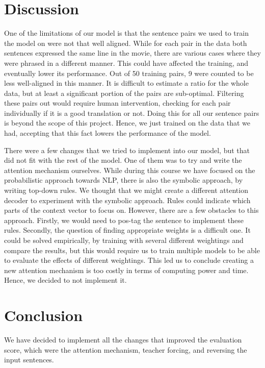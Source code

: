 \documentclass[11pt]{article}
\begin{document}
\section{Discussion}
One of the limitations of our model is that the sentence pairs we used to train the model on were not that well aligned. While for each pair in the data both sentences expressed the same line in the movie, there are various cases where they were phrased in a different manner. This could have affected the training, and eventually lower its performance. Out of 50 training pairs, 9 were counted to be less well-aligned in this manner. It is difficult to estimate a ratio for the whole data, but at least a significant portion of the pairs are sub-optimal. Filtering these pairs out would require human intervention, checking for each pair individually if it is a good translation or not. Doing this for all our sentence pairs is beyond the scope of this project. Hence, we just trained on the data that we had, accepting that this fact lowers the performance of the model.

There were a few changes that we tried to implement into our model, but that did not fit with the rest of the model. One of them was to try and write the attention mechanism ourselves. While during this course we have focused on the probabilistic approach towards NLP, there is also the symbolic approach, by writing top-down rules. We thought that we might create a different attention decoder to experiment with the symbolic approach. Rules could indicate which parts of the context vector to focus on. However, there are a few obstacles to this approach. Firstly, we would need to pos-tag the sentence to implement these rules. Secondly, the question of finding appropriate weights is a difficult one. It could be solved empirically, by training with several different weightings and compare the results, but this would require us to train multiple models to be able to evaluate the effects of different weightings. This led us to conclude creating a new attention mechanism is too costly in terms of computing power and time. Hence, we decided to not implement it.

\section{Conclusion}
We have decided to implement all the changes that improved the evaluation score, which were the attention mechanism, teacher forcing, and reversing the input sentences.
\end{document}

